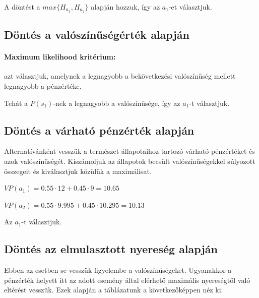 \documentclass[a4paper,12pt]{article}
\begin{document}
A döntést a $max\{H_{a_1},H_{a_2}\}$ alapján hozzuk, így az $a_1$-et választjuk.

\subsection{Döntés a valószínűségérték alapján}
\label{susec:vaert}
\paragraph{Maximum likelihood kritérium: } azt választjuk, amelynek a legnagyobb a bekövetkezési valószínűség mellett legnagyobb a pénzértéke. 

Tehát a $P(s_1)$-nek a legnagyobb a valószínűsége, így az $a_1$-t választjuk.

\subsection{Döntés a várható pénzérték alapján}
\label{VP}
Alternatívánként vesszük a természet állapotaihoz tartozó várható pénzértéket és azok valószínűségét. Kiszámoljuk az állapotok becsült valószínűségekkel súlyozott összegeit és kiválasztjuk közülük a maximálisat.

$VP(a_1) = 0.55\cdot 12 + 0.45\cdot 9 = 10.65$

$VP(a_2) = 0.55\cdot 9.995 + 0.45\cdot 10.295 = 10.13$

Az $a_1$-t választjuk.

\subsection{Döntés az elmulasztott nyereség alapján}
\label{susec:elmunyer}
Ebben az esetben se vesszük figyelembe a valószínűségeket. Ugyanakkor a pénzérték helyett itt az adott esemény által elérhető maximális nyereségtől való eltérést vesszük. Ezek alapján a táblázatunk a következőképpen néz ki:

\end{document}
